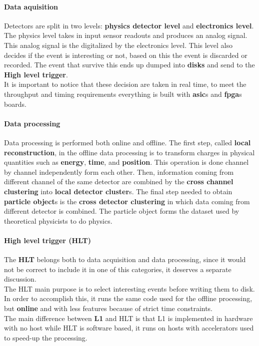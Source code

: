 \paragraph{Data aquisition}
Detectors are split in two levels: \textbf{physics detector level} and \textbf{electronics level}. The physics level takes in input sensor readouts and produces an analog signal. This analog signal is the digitalized by the electronics level. This level also decides if the event is interesting or not, based on this the event is discarded or recorded. 
The event that survive this ends up dumped into \textbf{disks} and send to the \textbf{High level trigger}. \\
It is important to notice that these decision are taken in real time, to meet the throughput and timing requirements everything is built with \textbf{asic}s and \textbf{fpga}s boards. 
\paragraph{Data processing} 
Data processing is performed both online and offline. %
The first step, called \textbf{local reconstruction}, in the offline data processing is to transform charges in physical quantities such as \textbf{energy}, \textbf{time}, and \textbf{position}. This operation is done channel by channel independently form each other. Then, information coming from different channel of the same detector are combined by the \textbf{cross channel clustering} into \textbf{local detector cluster}s. The final step needed to obtain \textbf{particle object}s is the \textbf{cross detector clustering} in which data coming from different detector is combined. The particle object forms the dataset used by theoretical physicists to do physics. \\
\paragraph{High level trigger (HLT)}
The \textbf{HLT} belongs both to data acquisition and data processing, since it would not be correct to include it in one of this categories, it deserves a separate discussion. \\
The HLT main purpose is to select interesting events before writing them to disk. In order to accomplish this, it runs the same code used for the offline processing, but \textbf{online} and with less features because of strict time constraints. \\
The main difference between \textbf{L1} and HLT is that L1 is implemented in hardware with no host while HLT is software based, it runs on hosts with accelerators used to speed-up the processing.
